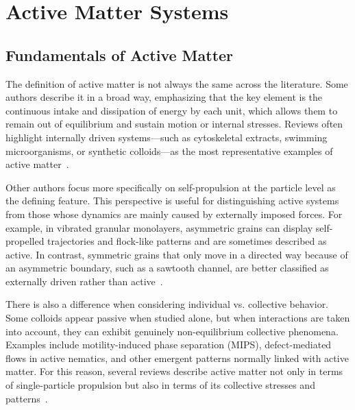 \chapter{Active Matter Systems}
\label{ch:activeandpassivemattersystems}

\section{Fundamentals of Active Matter}
\label{sct:fundamentalsofactivematter}


The definition of active matter is not always the same across the literature. Some authors describe it in a broad way, emphasizing that the key element is the continuous intake and dissipation of energy by each unit, which allows them to remain out of equilibrium and sustain motion or internal stresses. Reviews often highlight internally driven systems—such as cytoskeletal extracts, swimming microorganisms, or synthetic colloids—as the most representative examples of active matter~\cite{ramaswamy2010mechanics, marchetti2013hydrodynamics, bechinger2016active}.

Other authors focus more specifically on self-propulsion at the particle level as the defining feature. This perspective is useful for distinguishing active systems from those whose dynamics are mainly caused by externally imposed forces. For example, in vibrated granular monolayers, asymmetric grains can display self-propelled trajectories and flock-like patterns and are sometimes described as active. In contrast, symmetric grains that only move in a directed way because of an asymmetric boundary, such as a sawtooth channel, are better classified as externally driven rather than active~\cite{deseigne2010collective, mobarakabadi2013granular, fernandez2022active}.

There is also a difference when considering individual vs. collective behavior. Some colloids appear passive when studied alone, but when interactions are taken into account, they can exhibit genuinely non-equilibrium collective phenomena. Examples include motility-induced phase separation (MIPS), defect-mediated flows in active nematics, and other emergent patterns normally linked with active matter. For this reason, several reviews describe active matter not only in terms of single-particle propulsion but also in terms of its collective stresses and patterns~\cite{cates2015motility, doostmohammadi2018active}.

